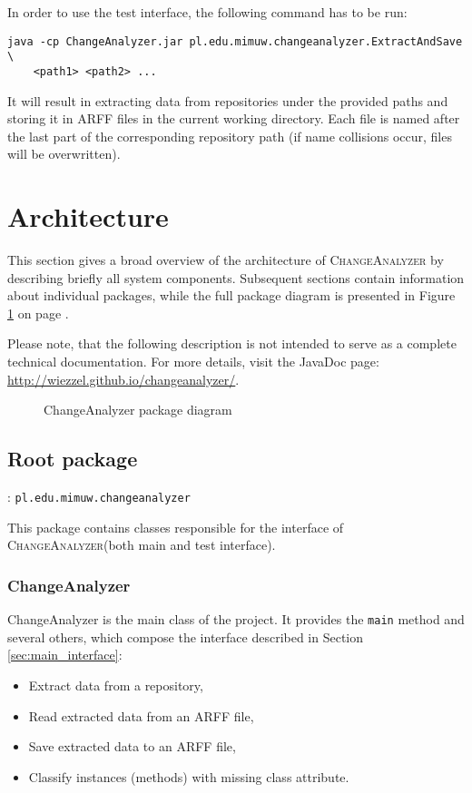 \documentclass{pracamgr}
\newcommand{\ca}{\textsc{ChangeAnalyzer}\xspace}
\newcommand{\pack}[3]{\subsection{#1 package} \label{sec:#2} \underline{\smash{Full package name}}: \texttt{#3}\medskip}
\begin{document}
In order to use the test interface, the following command has to be run:

\begin{verbatim}
java -cp ChangeAnalyzer.jar pl.edu.mimuw.changeanalyzer.ExtractAndSave \
    <path1> <path2> ...
\end{verbatim}

It will result in extracting data from repositories under the provided paths and storing it in ARFF files in the current working directory. Each file is named after the last part of the corresponding repository path (if name collisions occur, files will be overwritten).

\section{Architecture}
\label{sec:architecture}
This section gives a broad overview of the architecture of \ca by describing briefly all system components. Subsequent sections contain information about individual packages, while the full package diagram is presented in Figure \ref{fig:package_diagram} on page \pageref{fig:package_diagram}.

Please note, that the following description is not intended to serve as a complete technical documentation. For more details, visit the JavaDoc page: \url{http://wiezzel.github.io/changeanalyzer/}.

\begin{figure}[h]
\centering

\caption{ChangeAnalyzer package diagram}
\label{fig:package_diagram}
\end{figure}

\pack{Root}{root}{pl.edu.mimuw.changeanalyzer}

\noindent This package contains classes responsible for the interface of \ca (both main and test interface).

\subsubsection*{ChangeAnalyzer}
ChangeAnalyzer is the main class of the project. It provides the \texttt{main} method and several others, which compose the interface described in Section \ref{sec:main_interface}:
\begin{itemize}[noitemsep,topsep=1pt]
	\item Extract data from a repository,
    \item Read extracted data from an ARFF file,
    \item Save extracted data to an ARFF file,
    \item Classify instances (methods) with missing class attribute.
\end{itemize}
\end{document}
